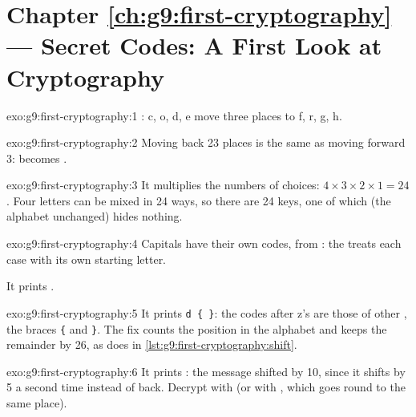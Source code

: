 \section*{Chapter \ref{ch:g9:first-cryptography} --- Secret Codes: A First Look at Cryptography}

\begin{solution}{exo:g9:first-cryptography:1}
: c, o, d, e move three places to f, r, g, h.
\end{solution}

\begin{solution}{exo:g9:first-cryptography:2}
Moving back 23 places is the same as moving forward 3:  becomes
.
\end{solution}

\begin{solution}{exo:g9:first-cryptography:3}
It multiplies the numbers of choices: $4 \times 3 \times 2 \times 1 = 24$. Four
letters can be mixed in 24 ways, so there are 24 keys, one of which (the
alphabet unchanged) hides nothing.
\end{solution}

\begin{solution}{exo:g9:first-cryptography:4}
Capitals have their own codes, from : the  treats each
case with its own starting letter.

\label{lst:g9:first-cryptography:sol-case}

It prints .
\end{solution}

\begin{solution}{exo:g9:first-cryptography:5}
It prints \texttt{d \{ \}}: the codes after z's are those of other
, the braces \texttt{\{} and \texttt{\}}. The fix counts the position in the alphabet and keeps
the remainder by 26, as  does in
\cref{lst:g9:first-cryptography:shift}.
\end{solution}

\begin{solution}{exo:g9:first-cryptography:6}
It prints : the message shifted by 10, since it
shifts by 5 a second time instead of back. Decrypt with 
(or with , which goes round to the same place).
\end{solution}

